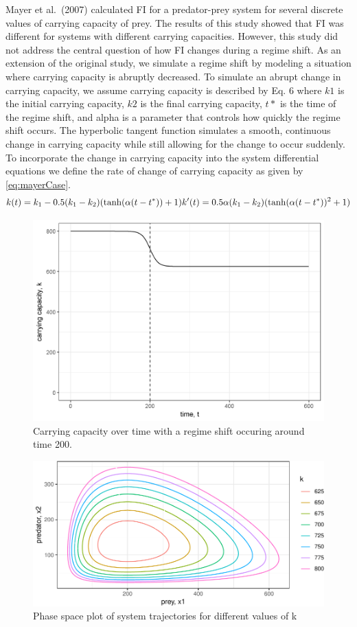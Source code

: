 \documentclass[12pt,twoside,openany]{reedthesis}
\begin{document}
Mayer et al.~(2007) calculated FI for a predator-prey system for several discrete values of carrying capacity of prey. The results of this study showed that FI was different for systems with different carrying capacities. However, this study did not address the central question of how FI changes during a regime shift. As an extension of the original study, we simulate a regime shift by modeling a situation where carrying capacity is abruptly decreased. To simulate an abrupt change in carrying capacity, we assume carrying capacity is described by Eq. 6 where \(k1\) is the initial carrying capacity, \(k2\) is the final carrying capacity, \(t*\) is the time of the regime shift, and alpha is a parameter that controls how quickly the regime shift occurs. The hyperbolic tangent function simulates a smooth, continuous change in carrying capacity while still allowing for the change to occur suddenly. To incorporate the change in carrying capacity into the system differential equations we define the rate of change of carrying capacity as given by \eqref{eq:mayerCase}.\\
\begin{equation}  
  k(t) = k_1  - 0.5(k_1-k_2)(\tanh(\alpha (t-t^*))+1)     \\
  k'(t) = 0.5\alpha (k_1-k_2)(\tanh(\alpha(t-t^*))^2 +1)      \\ 
\label{eq:mayerCase}
\end{equation}
\begin{figure}
\includegraphics[width=0.85\linewidth]{./chapterFiles/fiGuide/figures/kByTime} \caption{Carrying capacity over time with a regime shift occuring around time 200.}\label{fig:kByTime}
\end{figure}
\begin{figure}
\includegraphics[width=0.85\linewidth]{_myDissertation_files/figure-latex/kTrajectories-1} \caption{Phase space plot of system trajectories for different values of k}\label{fig:kTrajectories}
\end{figure}
\end{document}
